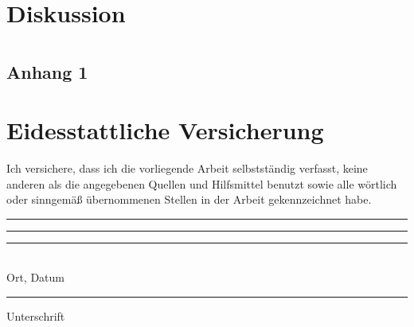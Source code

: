 \documentclass[a4paper,12pt]{report}
\begin{document}
\chapter{Diskussion}\label{chap:Diskussion}




%

\appendix
\chapter[Anhang]{}
\newpage
\section{Anhang 1}

\chapter*{Eidesstattliche Versicherung} %
Ich versichere, dass ich die vorliegende Arbeit selbstständig verfasst, keine anderen als die angegebenen Quellen und Hilfsmittel benutzt sowie alle wörtlich oder sinngemäß übernommenen Stellen in der Arbeit gekennzeichnet habe.
\\[2cm]
\noindent\rule{0.35\textwidth}{0.3pt}\rule{0.2\textwidth}{0pt}\rule{0.45\textwidth}{0.3pt}
\\Ort, Datum\rule{0.418\textwidth}{0pt}Unterschrift
\end{document}
